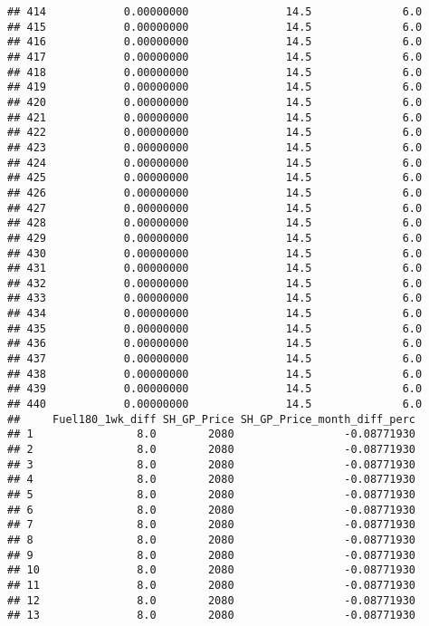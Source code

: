 \documentclass[]{article}
\begin{document}
\begin{verbatim}
## 414            0.00000000               14.5              6.0
## 415            0.00000000               14.5              6.0
## 416            0.00000000               14.5              6.0
## 417            0.00000000               14.5              6.0
## 418            0.00000000               14.5              6.0
## 419            0.00000000               14.5              6.0
## 420            0.00000000               14.5              6.0
## 421            0.00000000               14.5              6.0
## 422            0.00000000               14.5              6.0
## 423            0.00000000               14.5              6.0
## 424            0.00000000               14.5              6.0
## 425            0.00000000               14.5              6.0
## 426            0.00000000               14.5              6.0
## 427            0.00000000               14.5              6.0
## 428            0.00000000               14.5              6.0
## 429            0.00000000               14.5              6.0
## 430            0.00000000               14.5              6.0
## 431            0.00000000               14.5              6.0
## 432            0.00000000               14.5              6.0
## 433            0.00000000               14.5              6.0
## 434            0.00000000               14.5              6.0
## 435            0.00000000               14.5              6.0
## 436            0.00000000               14.5              6.0
## 437            0.00000000               14.5              6.0
## 438            0.00000000               14.5              6.0
## 439            0.00000000               14.5              6.0
## 440            0.00000000               14.5              6.0
##     Fuel180_1wk_diff SH_GP_Price SH_GP_Price_month_diff_perc
## 1                8.0        2080                 -0.08771930
## 2                8.0        2080                 -0.08771930
## 3                8.0        2080                 -0.08771930
## 4                8.0        2080                 -0.08771930
## 5                8.0        2080                 -0.08771930
## 6                8.0        2080                 -0.08771930
## 7                8.0        2080                 -0.08771930
## 8                8.0        2080                 -0.08771930
## 9                8.0        2080                 -0.08771930
## 10               8.0        2080                 -0.08771930
## 11               8.0        2080                 -0.08771930
## 12               8.0        2080                 -0.08771930
## 13               8.0        2080                 -0.08771930

\end{verbatim}
\end{document}
